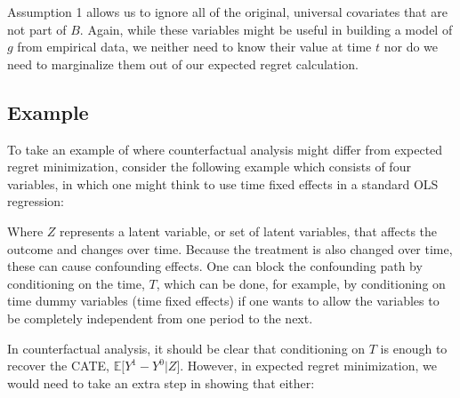 \documentclass[a4paper,12pt]{article}
\begin{document}
Assumption 1 allows us to ignore all of the original, universal covariates that are not part of $B$. Again, while these variables might be useful in building a model of $g$ from empirical data, we neither need to know their value at time $t$ nor do we need to marginalize them out of our expected regret calculation. 

\subsection*{Example}

To take an example of where counterfactual analysis might differ from expected regret minimization, consider the following example which consists of four variables, in which one might think to use time fixed effects in a standard OLS regression: 



Where $Z$ represents a latent variable, or set of latent variables, that affects the outcome and changes over time. Because the treatment is also changed over time, these can cause confounding effects. One can block the confounding path by conditioning on the time, $T$, which can be done, for example, by conditioning on time dummy variables (time fixed effects) if one wants to allow the variables to be completely independent from one period to the next.

In counterfactual analysis, it should be clear that conditioning on $T$ is enough to recover the CATE, $\mathbb{E} \big[ Y^1 - Y^0 \big | Z ]$. However, in expected regret minimization, we would need to take an extra step in showing that either: 
\end{document}
